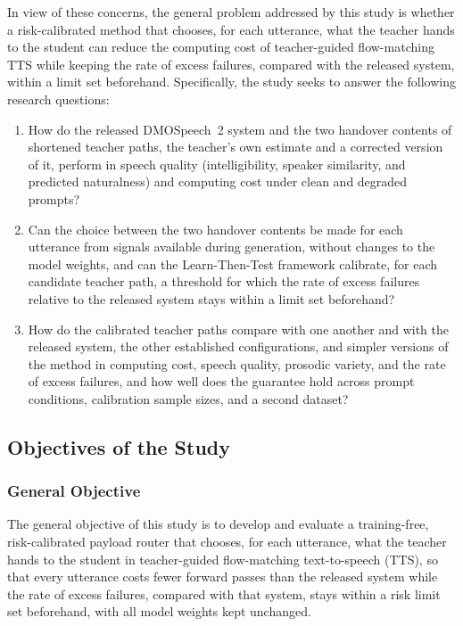 In view of these concerns, the general problem addressed by this study is whether a risk-calibrated method that chooses, for each utterance, what the teacher hands to the student can reduce the computing cost of teacher-guided flow-matching TTS while keeping the rate of excess failures, compared with the released system, within a limit set beforehand. Specifically, the study seeks to answer the following research questions:
\begin{enumerate}[leftmargin=1.4em]
\item How do the released DMOSpeech~2 system and the two handover contents of shortened teacher paths, the teacher's own estimate and a corrected version of it, perform in speech quality (intelligibility, speaker similarity, and predicted naturalness) and computing cost under clean and degraded prompts?
\item Can the choice between the two handover contents be made for each utterance from signals available during generation, without changes to the model weights, and can the Learn-Then-Test framework calibrate, for each candidate teacher path, a threshold for which the rate of excess failures relative to the released system stays within a limit set beforehand?
\item How do the calibrated teacher paths compare with one another and with the released system, the other established configurations, and simpler versions of the method in computing cost, speech quality, prosodic variety, and the rate of excess failures, and how well does the guarantee hold across prompt conditions, calibration sample sizes, and a second dataset?
\end{enumerate}

\subsection{Objectives of the Study}
\label{sec:objectives}

\subsubsection{General Objective}
The general objective of this study is to develop and evaluate a training-free, risk-calibrated payload router that chooses, for each utterance, what the teacher hands to the student in teacher-guided flow-matching text-to-speech (TTS), so that every utterance costs fewer forward passes than the released system while the rate of excess failures, compared with that system, stays within a risk limit set beforehand, with all model weights kept unchanged.

